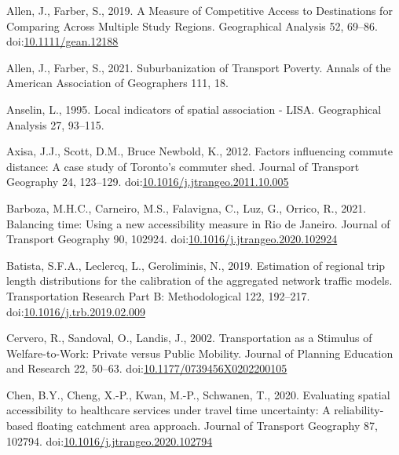 \documentclass[]{elsarticle} %
\newlength{\cslhangindent}
\newlength{\cslentryspacingunit} %
\newenvironment{CSLReferences}[2] %
 {%
  \setlength{\parindent}{0pt}
  \ifodd #1
  \let\oldpar\par
  \def\par{\hangindent=\cslhangindent\oldpar}
  \fi
  \setlength{\parskip}{#2\cslentryspacingunit}
 }%
 {}
\begin{document}
\hypertarget{refs}{}
\begin{CSLReferences}{1}{0}
\leavevmode{}%
Allen, J., Farber, S., 2019. A Measure of Competitive Access to
Destinations for Comparing Across Multiple Study Regions. Geographical
Analysis 52, 69--86.
doi:\href{https://doi.org/10.1111/gean.12188}{10.1111/gean.12188}

\leavevmode{}%
Allen, J., Farber, S., 2021. Suburbanization of {Transport} {Poverty}.
Annals of the American Association of Geographers 111, 18.

\leavevmode{}%
Anselin, L., 1995. Local indicators of spatial association - LISA.
Geographical Analysis 27, 93--115.

\leavevmode{}%
Axisa, J.J., Scott, D.M., Bruce Newbold, K., 2012. Factors influencing
commute distance: A case study of {Toronto}'s commuter shed. Journal of
Transport Geography 24, 123--129.
doi:\href{https://doi.org/10.1016/j.jtrangeo.2011.10.005}{10.1016/j.jtrangeo.2011.10.005}

\leavevmode{}%
Barboza, M.H.C., Carneiro, M.S., Falavigna, C., Luz, G., Orrico, R.,
2021. Balancing time: {Using} a new accessibility measure in {Rio} de
{Janeiro}. Journal of Transport Geography 90, 102924.
doi:\href{https://doi.org/10.1016/j.jtrangeo.2020.102924}{10.1016/j.jtrangeo.2020.102924}

\leavevmode{}%
Batista, S.F.A., Leclercq, L., Geroliminis, N., 2019. Estimation of
regional trip length distributions for the calibration of the aggregated
network traffic models. Transportation Research Part B: Methodological
122, 192--217.
doi:\href{https://doi.org/10.1016/j.trb.2019.02.009}{10.1016/j.trb.2019.02.009}

\leavevmode{}%
Cervero, R., Sandoval, O., Landis, J., 2002. Transportation as a
{Stimulus} of {Welfare}-to-{Work}: {Private} versus {Public} {Mobility}.
Journal of Planning Education and Research 22, 50--63.
doi:\href{https://doi.org/10.1177/0739456X0202200105}{10.1177/0739456X0202200105}

\leavevmode{}%
Chen, B.Y., Cheng, X.-P., Kwan, M.-P., Schwanen, T., 2020. Evaluating
spatial accessibility to healthcare services under travel time
uncertainty: {A} reliability-based floating catchment area approach.
Journal of Transport Geography 87, 102794.
doi:\href{https://doi.org/10.1016/j.jtrangeo.2020.102794}{10.1016/j.jtrangeo.2020.102794}


\end{CSLReferences}
\end{document}
